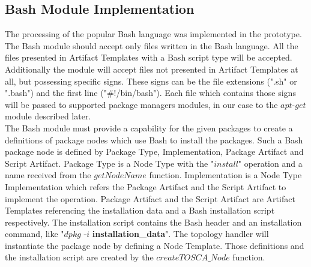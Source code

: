 \subsection*{Bash Module Implementation}
The processing of the popular Bash language was implemented in the prototype. 
The Bash module should accept only files written in the Bash language.
All the files presented in Artifact Templates with a Bash script type will be accepted.
Additionally the module will accept files not presented in Artifact Templates at all, but possessing specific signs.
These signs can be the file extensions (".sh" or ".bash") and the first line ("\#!/bin/bash"). 
Each file which contains those signs will be passed to supported package managers modules, in our case to the $apt$-$get$ module described later. \\
The Bash module must provide a capability for the given packages to create a definitions of package nodes which use Bash to install the packages.
Such a Bash package node is defined by Package Type,  Implementation, Package Artifact and Script Artifact.
Package Type is a Node Type with the "$install$" operation and a name received from the $getNodeName$ function.
Implementation is a Node Type Implementation which refers the Package Artifact and the Script Artifact to implement the operation.
Package Artifact and the Script Artifact are Artifact Templates referencing the installation data and a Bash installation script respectively.
The installation script contains the Bash header and an installation command, like "$dpkg$ -$i$ \textbf{installation\_data}".
The topology handler will instantiate the package node by defining a Node Template.
Those definitions and the installation script are created by the $createTOSCA\_Node$ function.

